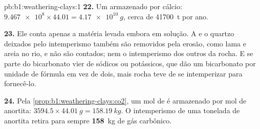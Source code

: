 \begin{solution}{pb:b1:weathering-clays:1}
\textbf{22.} Um  armazenado por cálcio: $\num{9.467e8} \times 44.01 =
\qty{4.17e10}{g}$, cerca de \qty{41700}{t} por ano.

\textbf{23.} Ele conta apenas a matéria levada embora em solução. A  e o quartzo deixados pelo intemperismo também são removidos pela erosão, como lama e areia no rio, e não são contados; nem o intemperismo dos outros  da rocha. E se parte do bicarbonato vier de  sódicos ou potássicos, que dão um bicarbonato por unidade de fórmula em vez de dois, mais rocha teve de se intemperizar para fornecê-lo.

\textbf{24.} Pela \cref{prop:b1:weathering-clays:co2}, um mol de  é armazenado por mol de anortita: $3594.5 \times \qty{44.01}{g} = \qty{158.19}{kg}$. O intemperismo de uma tonelada de anortita retira para sempre
\textbf{158}~kg de gás carbônico.
\end{solution}

